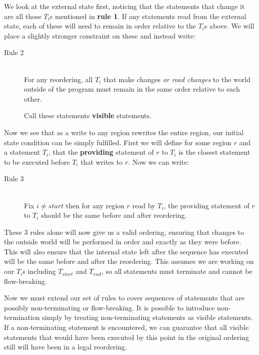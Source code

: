 \documentclass[twoside,a4paper]{report}
\begin{document}
We look at the external state first, noticing that the statements that change it are all those $T_i$s mentioned in \textbf{rule 1}. If any statements
read from the external state, each of these will need to remain in order relative to the $T_i$s above. We will place a slightly stronger constraint on these
and instead write:

\begin{description}
\item[Rule 2] \hfill \\
For any reordering, all $T_i$ that make changes \textit{or read changes} to the world outside of the program must remain in the same order relative to each other.

Call these statements \textbf{visible} statements.
\end{description}

Now we see that as a write to any region rewrites the entire region, our initial state condition can be simply fulfilled. First we will define for some region
$r$ and a statement $T_i$, that the \textbf{providing} statement of $r$ to $T_i$ is the closest statement to be executed before $T_i$ that writes to $r$. Now
we can write:

\begin{description}
\item[Rule 3] \hfill \\
Fix $i \ne {start}$ then for any region $r$ read by $T_i$, the providing statement of $r$ to $T_i$ should be the same before and after reordering.
\end{description}

These 3 rules alone will now give us a valid ordering, ensuring that changes to the outside world will be performed in order and exactly as they were before.
This will also ensure that the internal state left after the sequence has executed will be the same before and after the reordering. This assumes we are working
on our $T_i$s including $T_{start}$ and $T_{end}$, so all statements must terminate and cannot be flow-breaking.

Now we must extend our set of rules to cover sequences of statements that are possibly non-terminating or flow-breaking. It is possible to introduce non-termination
simply by treating non-terminating statements as visible statements. If a non-terminating statement is encountered, we can guarantee that all visible statements that
would have been executed by this point in the original ordering still will have been in a legal reordering.
\end{document}
